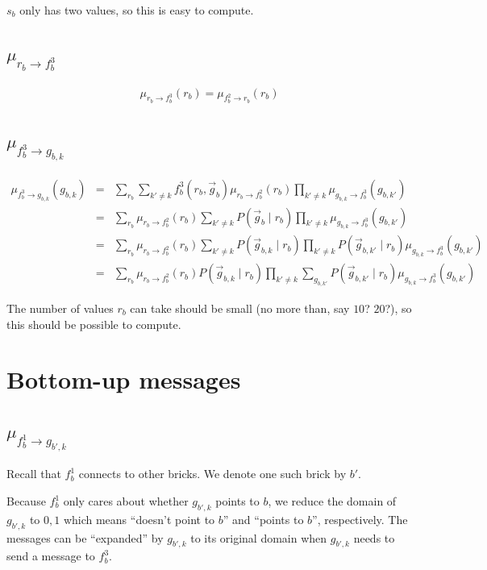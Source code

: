 \documentclass[11pt]{article}
\newcommand{\fb}[1]{f_b^{#1}}
\newcommand{\mFbRb}[1]{\mu_{ \fb{#1} \rightarrow r_{b}}}
\newcommand{\mRbFb}[1]{\mu_{ r_{b} \rightarrow  \fb{#1}}}
\newcommand{\mFbGbk}[1]{\mu_{ \fb{#1} \rightarrow g_{b,k}}}
\newcommand{\mGbkFb}[1]{\mu_{  g_{b,k} \rightarrow \fb{#1}}}
\begin{document}
$s_b$ only has two values, so this is easy to compute.

\subsection{$\mRbFb3$}

\begin{eqnarray}
\mRbFb3(r_b)  = \mFbRb2(r_b)
\end{eqnarray}

\subsection{$\mFbGbk3$}

\begin{eqnarray}
\mFbGbk3(g_{b,k}) &=& \sum_{r_b} \sum_{k' \neq k} \fb3(r_b,\vec{g}_b) \mRbFb2(r_b) \prod_{k' \neq k} \mGbkFb3(g_{b,k'}) \\
&=& \sum_{r_b} \mRbFb2(r_b) \sum_{k' \neq k}P(\vec{g}_b \mid r_b)  \prod_{k' \neq k}  \mGbkFb3(g_{b,k'}) \\
&=& \sum_{r_b} \mRbFb2(r_b) \sum_{k' \neq k} P(\vec{g}_{b,k} \mid r_b)  \prod_{k' \neq k} P(\vec{g}_{b,k'} \mid r_b)  \mGbkFb3(g_{b,k'}) \\
&=& \sum_{r_b} \mRbFb2(r_b)  P(\vec{g}_{b,k} \mid r_b) \prod_{k' \neq k} \sum_{g_{b,k'}}  P(\vec{g}_{b,k'} \mid r_b)  \mGbkFb3(g_{b,k'})
\end{eqnarray}

The number of values $r_b$ can take should be small (no more than, say $10$? $20$?), so this should be possible to compute.

\section{Bottom-up messages}


\subsection{$\mu_{\fb1 \rightarrow g_{b',k}}$}

Recall that $\fb1$ connects to other bricks. We denote one such brick by $b'$.

Because $\fb1$ only cares about whether $g_{b',k}$ points to $b$, we reduce the domain of $g_{b',k}$ to $0,1$ which means ``doesn't point to $b$'' and ``points to $b$'', respectively. The messages can be ``expanded'' by $g_{b',k}$ to its original domain when $g_{b',k}$ needs to send a message to $\fb3$.
\end{document}
